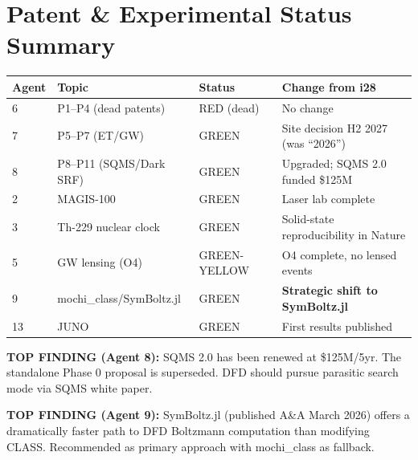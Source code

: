 \documentclass[11pt,a4paper]{article}
\begin{document}
\section{Patent \& Experimental Status Summary}

\begin{center}
\begin{longtable}{llll}
\toprule
\textbf{Agent} & \textbf{Topic} & \textbf{Status} & \textbf{Change from i28} \\
\midrule
\endfirsthead
6 & P1--P4 (dead patents) & RED (dead) & No change \\
7 & P5--P7 (ET/GW) & GREEN & Site decision H2 2027 (was ``2026'') \\
8 & P8--P11 (SQMS/Dark SRF) & GREEN & Upgraded; SQMS 2.0 funded \$125M \\
2 & MAGIS-100 & GREEN & Laser lab complete \\
3 & Th-229 nuclear clock & GREEN & Solid-state reproducibility in Nature \\
5 & GW lensing (O4) & GREEN-YELLOW & O4 complete, no lensed events \\
9 & mochi\_class/SymBoltz.jl & GREEN & \textbf{Strategic shift to SymBoltz.jl} \\
13 & JUNO & GREEN & First results published \\
\bottomrule
\end{longtable}
\end{center}

\textbf{TOP FINDING (Agent 8):} SQMS 2.0 has been renewed at \$125M/5yr. The standalone Phase 0 proposal is superseded. DFD should pursue parasitic search mode via SQMS white paper.

\textbf{TOP FINDING (Agent 9):} SymBoltz.jl (published A\&A March 2026) offers a dramatically faster path to DFD Boltzmann computation than modifying CLASS. Recommended as primary approach with mochi\_class as fallback.
\end{document}
